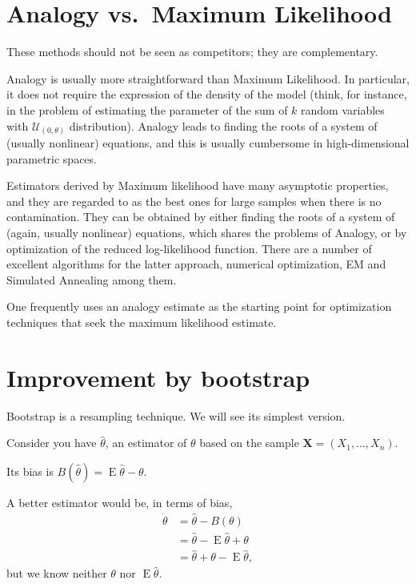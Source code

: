 \section{Analogy vs.\ Maximum Likelihood}

These methods should not be seen as competitors; they are complementary.

Analogy is usually more straightforward than Maximum Likelihood.
In particular, it does not require the expression of the density of the model (think, for instance, in the problem of estimating the parameter of the sum of $k$ random variables with $\mathcal U_{(0,\theta)}$ distribution).
Analogy leads to finding the roots of a system of (usually nonlinear) equations, and this is usually cumbersome in high-dimensional parametric spaces.

Estimators derived by Maximum likelihood have many asymptotic properties, and they are regarded to as the best ones for large samples when there is no contamination.
They can be obtained by either finding the roots of a system of (again, usually nonlinear) equations, which shares the problems of Analogy, or by optimization of the reduced log-likelihood function.
There are a number of excellent algorithms for the latter approach, numerical optimization\cite{maxLik}, EM and Simulated Annealing among them.

One frequently uses an analogy estimate as the starting point for optimization techniques that seek the maximum likelihood estimate.

\section{Improvement by bootstrap}

Bootstrap is a resampling technique.
We will see its simplest version.

Consider you have $\widehat{\theta}$, an estimator of $\theta$ based on the sample $\bm X=(X_1,\dots,X_n)$.

Its bias is $B(\widehat{\theta})=\operatorname{E}\widehat{\theta}-\theta$.

A better estimator would be, in terms of bias,
\begin{align}
\dot{\theta}	&=\widehat{\theta}-B(\theta)\\
				&=\widehat{\theta}- \operatorname{E}\widehat{\theta}+\theta\nonumber\\
				&=\widehat{\theta}+\theta-\operatorname{E}\widehat{\theta},
\end{align}
but we know neither $\theta$ nor $\operatorname{E}\widehat{\theta}$.

